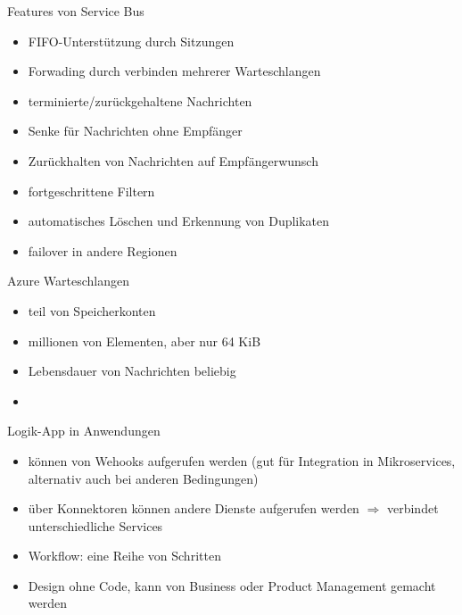 \begin{flashcard}[]{Features von Service Bus}
  \begin{itemize}
    \item FIFO-Unterstützung durch Sitzungen
    \item Forwading durch verbinden mehrerer Warteschlangen
    \item terminierte/zurückgehaltene Nachrichten
    \item Senke für Nachrichten ohne Empfänger
    \item Zurückhalten von Nachrichten auf Empfängerwunsch
    \item fortgeschrittene Filtern
    \item automatisches Löschen und Erkennung von Duplikaten
    \item failover in andere Regionen
  \end{itemize}
\end{flashcard}

\begin{flashcard}[]{Azure Warteschlangen}
  \begin{itemize}
    \item teil von Speicherkonten
    \item millionen von Elementen, aber nur 64 KiB
    \item Lebensdauer von Nachrichten beliebig
    \item 
  \end{itemize}
\end{flashcard}

\begin{flashcard}[]{Logik-App in Anwendungen}
  \begin{itemize}
    \item können von Wehooks aufgerufen werden (gut für Integration in Mikroservices, alternativ auch bei anderen Bedingungen)
    \item über Konnektoren können andere Dienste aufgerufen werden
      $\Rightarrow$ verbindet unterschiedliche Services
    \item Workflow: eine Reihe von Schritten
    \item Design ohne Code, kann von Business oder Product Management gemacht werden
  \end{itemize}
\end{flashcard}

